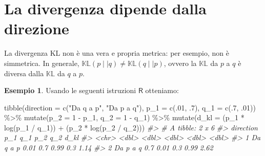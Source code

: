 \documentclass[
  11pt,
]{krantz}
\makeatletter
\newenvironment{Shaded}{\begin{snugshade}}{\end{snugshade}}
\newcommand{\AttributeTok}[1]{\textcolor[rgb]{0.61,0.61,0.61}{#1}}
\newcommand{\CommentTok}[1]{\textcolor[rgb]{0.37,0.37,0.37}{\textit{#1}}}
\newcommand{\DecValTok}[1]{\textcolor[rgb]{0.06,0.06,0.06}{#1}}
\newcommand{\FunctionTok}[1]{\textcolor[rgb]{0,0,0}{#1}}
\newcommand{\NormalTok}[1]{#1}
\newcommand{\SpecialCharTok}[1]{\textcolor[rgb]{0,0,0}{#1}}
\newcommand{\StringTok}[1]{\textcolor[rgb]{0.5,0.5,0.5}{#1}}
\newenvironment{kframe}{%
\medskip{}
\setlength{\fboxsep}{.8em}
 \def\at@end@of@kframe{}%
 \ifinner\ifhmode%
  \def\at@end@of@kframe{\end{minipage}}%
  \begin{minipage}{\columnwidth}%
 \fi\fi%
 \def\FrameCommand##1{\hskip\@totalleftmargin \hskip-\fboxsep
 \colorbox{shadecolor}{##1}\hskip-\fboxsep
     \hskip-\linewidth \hskip-\@totalleftmargin \hskip\columnwidth}%
 \MakeFramed {\advance\hsize-\width
   \@totalleftmargin\z@ \linewidth\hsize
   \@setminipage}}%
 {\par\unskip\endMakeFramed%
 \at@end@of@kframe}
\renewenvironment{Shaded}{\begin{kframe}}{\end{kframe}}
\newcommand{\R}{\textsf{R}} %
\theoremstyle{definition}
\theoremstyle{definition}
\newtheorem{example}{Esempio}[chapter]
\theoremstyle{definition}
\theoremstyle{definition}
\theoremstyle{remark}
\makeatother
\begin{document}
\hypertarget{la-divergenza-dipende-dalla-direzione}{%
\section{La divergenza dipende dalla direzione}\label{la-divergenza-dipende-dalla-direzione}}

La divergenza KL non è una vera e propria metrica: per esempio, non è simmetrica. In generale, \(\mathbb{KL}(p \mid\mid q) \neq \mathbb{KL}(q \mid\mid p)\), ovvero la \(\mathbb{KL}\) da \(p\) a \(q\) è diversa dalla \(\mathbb{KL}\) da \(q\) a \(p\).

\begin{example}

Usando le seguenti istruzioni \(\R\) otteniamo:

\begin{Shaded}
\begin{Highlighting}[]
\FunctionTok{tibble}\NormalTok{(}\AttributeTok{direction =} \FunctionTok{c}\NormalTok{(}\StringTok{"Da q a p"}\NormalTok{, }\StringTok{"Da p a q"}\NormalTok{),}
       \AttributeTok{p\_1 =} \FunctionTok{c}\NormalTok{(.}\DecValTok{01}\NormalTok{, .}\DecValTok{7}\NormalTok{),}
       \AttributeTok{q\_1 =} \FunctionTok{c}\NormalTok{(.}\DecValTok{7}\NormalTok{, .}\DecValTok{01}\NormalTok{)) }\SpecialCharTok{\%\textgreater{}\%}
  \FunctionTok{mutate}\NormalTok{(}\AttributeTok{p\_2 =} \DecValTok{1} \SpecialCharTok{{-}}\NormalTok{ p\_1,}
         \AttributeTok{q\_2 =} \DecValTok{1} \SpecialCharTok{{-}}\NormalTok{ q\_1) }\SpecialCharTok{\%\textgreater{}\%}
  \FunctionTok{mutate}\NormalTok{(}\AttributeTok{d\_kl =}\NormalTok{ (p\_1 }\SpecialCharTok{*} \FunctionTok{log}\NormalTok{(p\_1 }\SpecialCharTok{/}\NormalTok{ q\_1)) }\SpecialCharTok{+}\NormalTok{ (p\_2 }\SpecialCharTok{*} \FunctionTok{log}\NormalTok{(p\_2 }\SpecialCharTok{/}\NormalTok{ q\_2)))}
\CommentTok{\#\textgreater{} \# A tibble: 2 x 6}
\CommentTok{\#\textgreater{}   direction   p\_1   q\_1   p\_2   q\_2  d\_kl}
\CommentTok{\#\textgreater{}   \textless{}chr\textgreater{}     \textless{}dbl\textgreater{} \textless{}dbl\textgreater{} \textless{}dbl\textgreater{} \textless{}dbl\textgreater{} \textless{}dbl\textgreater{}}
\CommentTok{\#\textgreater{} 1 Da q a p   0.01  0.7   0.99  0.3   1.14}
\CommentTok{\#\textgreater{} 2 Da p a q   0.7   0.01  0.3   0.99  2.62}
\end{Highlighting}
\end{Shaded}

\end{example}
\end{document}
